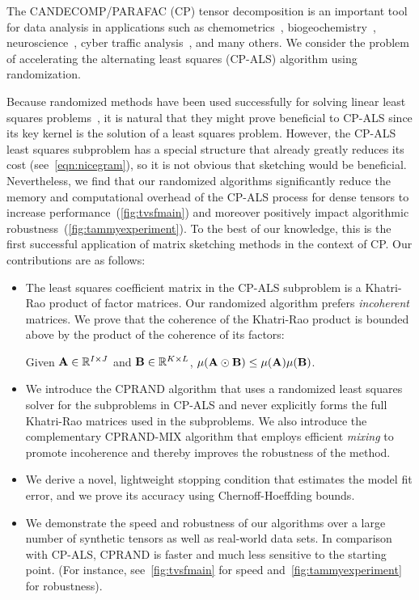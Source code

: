 The CANDECOMP/PARAFAC (CP) tensor decomposition is an important tool
for data analysis in applications such as chemometrics~\cite{MuStGrBr13}, biogeochemistry~\cite{JaCaYa14},
neuroscience~\cite{AcBiBiBr07,DaGiCaWa13,CoLiKuGo15}, cyber traffic analysis~\cite{MaGuFa11}, and many others.
%
We consider the problem of accelerating the alternating least squares (CP-ALS) algorithm using randomization.

Because randomized methods have been used successfully for solving
linear least squares problems~\cite{DrMaMuSa11,blendenpik,sketching}, it is natural that they might prove
beneficial to CP-ALS since its key kernel is the solution of a least
squares problem. However, the CP-ALS least squares subproblem has a
special structure that already greatly reduces its cost (see~\cref{eqn:nicegram}), so it is not obvious that sketching would be beneficial.
Nevertheless, we find that our randomized algorithms significantly reduce the memory and computational overhead of the CP-ALS process for dense tensors to increase performance~(\cref{fig:tvsfmain}) and moreover positively impact algorithmic robustness~(\cref{fig:tammyexperiment}).
To the best of our knowledge, this is the first successful application of matrix sketching methods in the context of CP.
Our contributions are as follows:
\begin{itemize}
\item 
The least squares coefficient matrix in the CP-ALS subproblem is a Khatri-Rao product of factor matrices. 
Our randomized algorithm prefers \emph{incoherent} matrices.
We prove that the coherence of the Khatri-Rao product is bounded 
above by the product of the coherence of its factors:
\begin{lemma} \label{lem:krp}
Given $\M{A} \in \mathbb{R}^{I \times J}$ and $\M{B} \in \mathbb{R}^{K \times L}$, $\mu(\M{A} \odot \M{B}) \leq \mu(\M{A})\mu(\M{B})$.
\end{lemma}
\item We introduce the CPRAND algorithm that uses a randomized least squares solver for the subproblems in CP-ALS and never explicitly forms the full Khatri-Rao matrices used in the subproblems.
We also introduce the complementary CPRAND-MIX algorithm that employs efficient \emph{mixing} to promote incoherence and thereby improves the robustness of the method.
\item We derive a novel, lightweight stopping condition that estimates
  the model fit error, and we prove its accuracy using Chernoff-Hoeffding bounds.
\item We demonstrate the speed and robustness of our algorithms over a
  large number of synthetic tensors as well as real-world data
  sets. In comparison with CP-ALS, CPRAND is faster and much less sensitive to
  the starting point. (For instance, see~\cref{fig:tvsfmain} for speed and~\cref{fig:tammyexperiment} for robustness).
\end{itemize}
